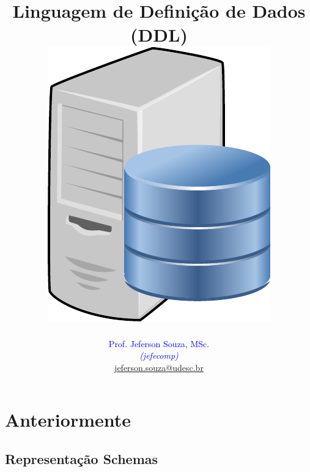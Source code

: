 \documentclass[xcolor=x11names,compress]{beamer}
\begin{document}
\title[Linguagem de Definição de Dados (DDL) \hskip13mm \insertframenumber / \inserttotalframenumber  \hskip33.5mm \inserttitlegraphic]{Linguagem de Definição de Dados (DDL) \\[4mm]
\includegraphics[keepaspectratio,width=.25\textwidth]{database-server}}
\author[@2018 Prof. Jeferson Souza, MSc (jefecomp) - All rights reserved.]{
	\textcolor{blue}{Prof. Jeferson Souza, MSc.} \\[1mm] 
	\textcolor{blue}{\textit{{\footnotesize (jefecomp) }}}\\[1.5mm]
	 \underline{{\footnotesize jeferson.souza@udesc.br}}
	 \vspace*{1mm}
}

\date{}


\begin{frame}
\titlepage
\end{frame}


\section{Anteriormente}
\subsection{Representação Schemas}
\end{document}
